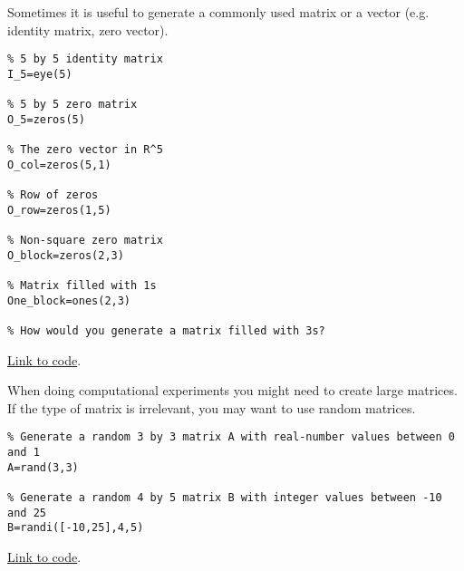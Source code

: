 \documentclass{ximera}
\begin{document}
\begin{template}\label{temp:id_matrix}
Sometimes it is useful to generate a commonly used matrix or a vector (e.g. identity matrix, zero vector). 
\begin{verbatim}
% 5 by 5 identity matrix
I_5=eye(5)

% 5 by 5 zero matrix
O_5=zeros(5)

% The zero vector in R^5
O_col=zeros(5,1)

% Row of zeros
O_row=zeros(1,5)

% Non-square zero matrix
O_block=zeros(2,3)

% Matrix filled with 1s
One_block=ones(2,3)

% How would you generate a matrix filled with 3s?
\end{verbatim}

\href{https://sagecell.sagemath.org/?z=eJxdzj0PgjAQBuCdhP9wC4kmOCBhNK46qAlx1vBxSGPtxbZY66-XYiHqcsPdc-9dBBmUti-sRqGZtnArtGTPMNiesxVanGXzMAiDaHQvlDSZQ29cQ03q2OKHPLDSJIEJyE-ZkxXx0caJ1zkZoGZYUM5IMt4k8Zi4J7FQ966Q-H-75FRdvV_Gqfe7YQ4N4xxrMEy3kLhwgX6BBH77Tf-DoY7XYKmDCwqUhUYo_KGfoFSt342kXHo=&lang=octave&interacts=eJyLjgUAARUAuQ==}{Link to code}.
\end{template}

\begin{template}\label{temp:randMat}
    When doing computational experiments you might need to create large matrices.  If the type of matrix is irrelevant, you may want to use random matrices.

    \begin{verbatim}
% Generate a random 3 by 3 matrix A with real-number values between 0 and 1
A=rand(3,3)

% Generate a random 4 by 5 matrix B with integer values between -10 and 25
B=randi([-10,25],4,5)
    \end{verbatim}

\href{https://sagecell.sagemath.org/?z=eJxtzLEKwjAUheE9kHc4S6GFFGzTjA7t0ocQhxu8aKCJEFNb397U4qTLGX44X4GRA0dKDEKkcLl7aNhXHk8puhU9FpduiExTHWZvOeJJ08wPWE4Lc8AB-YdGiv64CaVWupJCiuKP3W22-drDbruQ-Prr1s0ut0aK4UO78pSjas1ZdcpUb3XOOqE=&lang=octave&interacts=eJyLjgUAARUAuQ==}{Link to code}.    
\end{template}
\end{document}

